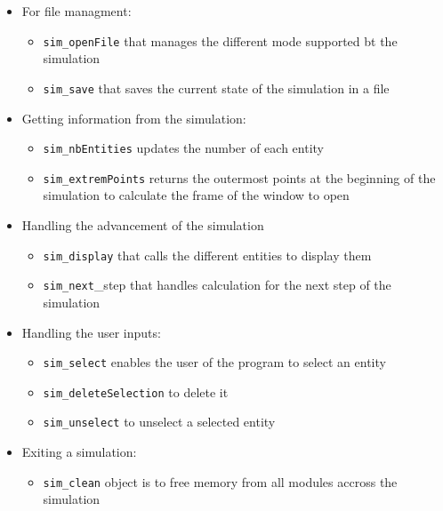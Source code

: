 \documentclass[a4paper]{article} %
\begin{document}
\begin{multicols*}{2}
\begin{itemize}
\item For file managment:
    \begin{itemize}
    \item \texttt{sim\_openFile} that manages the different mode supported bt the simulation
    \item \texttt{sim\_save} that saves the current state of the simulation in a file
    \end{itemize}
\item Getting information from the simulation:
    \begin{itemize}
    \item \texttt{sim\_nbEntities} updates the number of each entity
    \item \texttt{sim\_extremPoints} returns the outermost points at the beginning of the simulation to calculate the frame of the window to open
    \end{itemize}
\item Handling the advancement of the simulation
    \begin{itemize}
    \item \texttt{sim\_display} that calls the different entities to display them
    \item \texttt{sim\_next}\_step that handles calculation for the next step of the simulation
    \end{itemize}
\item Handling the user inputs:
    \begin{itemize}
    \item \texttt{sim\_select} enables the user of the program to select an entity
    \item \texttt{sim\_deleteSelection} to delete it
    \item \texttt{sim\_unselect} to unselect a selected entity
    \end{itemize}
\item Exiting a simulation:
    \begin{itemize}
    \item \texttt{sim\_clean} object is to free memory from all modules accross the simulation
    \end{itemize}
\end{itemize}



\label{lastpage}
\end{multicols*}
\end{document}
